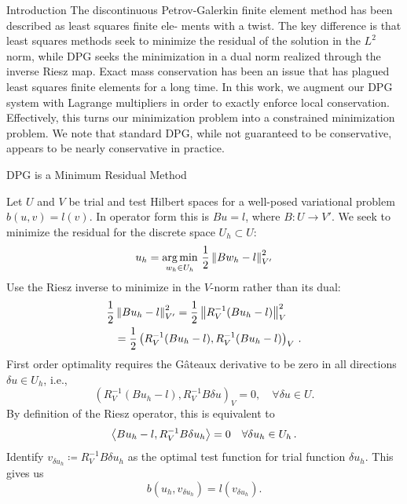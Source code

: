 \documentclass[final]{beamer}
\newlength{\onecolwid}
\begin{document}
\begin{frame}[t]
\begin{columns}[t]
\begin{column}{\onecolwid}
\begin{block}{Introduction}
The discontinuous Petrov-Galerkin finite element method has been described as least squares finite ele-
ments with a twist. The key difference is that least squares methods seek to minimize the residual of the
solution in the $L^2$ norm, while DPG seeks the minimization in a dual norm realized through the inverse Riesz
map. Exact mass conservation has been an issue that has plagued least squares finite elements for a long
time. In this work, we augment our DPG system with Lagrange multipliers in
order to exactly enforce local conservation. Effectively, this turns our
minimization problem into a constrained minimization problem. We note that
standard DPG, while not guaranteed to be conservative, appears to be nearly
conservative in practice.

\end{block}


\begin{block}{DPG is a Minimum Residual Method}

Let $U$ and $V$ be trial and test Hilbert spaces for a well-posed variational
problem $b(u,v)=l(v)$. In operator form this is $Bu=l$, where $B:U\rightarrow
V'$. We seek to minimize the residual for the discrete space $U_h\subset U$:
\[
u_{h} = \underset{w_{h} \in U_{h}} {\operatorname*{arg\,min}} \,\, \frac{1}{2}
\left\| Bw_{h}-l \right\|_{V'}^{2}
\]
Use the Riesz inverse to minimize in the $V$-norm rather than its dual:
\begin{align*}
\frac{1}{2}&\left\| Bu_h-l \right\|^2_{V'}=\frac{1}{2}\left\| R_V^{-1}(Bu_h-l) \right\|^2_V\\
&=\frac{1}{2}\left( R_V^{-1}(Bu_h-l),R_V^{-1}(Bu_h-l) \right)_V\,.
\end{align*}
First order optimality requires
the G\^ateaux derivative to be zero in all directions $\delta u \in
U_h$, i.e.,
\[
\left(R_V^{-1}(Bu_h-l),R_V^{-1}B\delta u\right)_V = 0, \quad \forall \delta u \in U.
\]
By definition of the Riesz operator, this is equivalent to
\begin{equation*}
\left\langle Bu_h-l,R_V^{-1}B\delta u_h \right\rangle=0\quad\forall\delta u_h\in U_h\,.
\end{equation*}
Identify $v_{\delta u_h}\coloneqq R_V^{-1}B\delta u_h$ as the
optimal test function for trial function $\delta u_h$. This gives us
\begin{equation*}
b(u_h,v_{\delta u_h})=l(v_{\delta u_h}).
\end{equation*}


\end{block}
\end{column}
\end{columns}
\end{frame}
\end{document}
